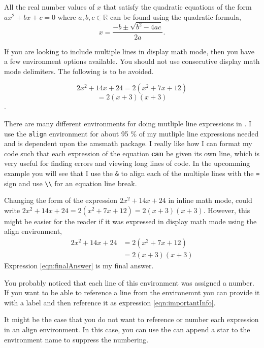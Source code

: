 \begin{mhotexbox}
All the real number values of \( x \) that satisfy the quadratic equations
of the form \( ax^2 + bx + c = 0 \) where \( a, b, c \in \mathbb{R} \) 
can be found using the quadratic formula,
\[
  x = \frac{-b \pm \sqrt{b^2 - 4ac}}{2a}.
\]
\end{mhotexbox}

If you are looking to include multiple lines in display math mode, then
you have a few environment options available.  You should not use 
consecutive display math mode delimiters.  The following is to be avoided.

\begin{mhotexbox}
  \[ 
    2x^2 + 14x + 24 = 2( x^2 + 7x + 12 )
  \]
  \[ 
    = 2(x + 3)(x + 3) 
  \].
\end{mhotexbox}

There are many different environments for doing mutliple line expressions
in . I use the \texttt{align} environment for
about 95 \% of my mutliple line expressions needed and is dependent upon 
the amsmath package.  I really like how I can format my code such that 
each expression of the equation \textbf{can} be given its own line, 
which is very useful for finding errors and viewing long lines of code.
In the upcomming example you will see that I use the \verb!&! to align
each of the multiple lines with the \verb!=! sign and use \verb!\\!
for an equation line break.

\begin{mhotexbox}
Changing the form of the expression \( 2x^2 + 14x + 24 \) in inline math 
mode, could write \( 2x^2 + 14x + 24 = 2( x^2 + 7x + 12 ) = 2(x + 3)(x + 3) \).  
However, this might be easier for the reader if it was expressed in 
display math mode using the align environment,
\begin{align}
  2x^2 + 14x + 24 
  &= 2( x^2 + 7x + 12 ) \label{eqn:importantInfo}\\
  &= 2(x + 3)(x + 3)  \label{eqn:finalAnswer}
\end{align}
Expression \ref{eqn:finalAnswer} is my final answer.
\end{mhotexbox}
You probably noticed that each line of this environment was assigned a 
number. If you want to be able to reference a line from the environemnt 
you can provide it with a label and then reference it as 
expression \ref{eqn:importantInfo}.

It might be the case that you do not want to reference or number each 
expression in an align environment.  In this case, you can use the 
can append a star to the environment name to suppress the numbering.

